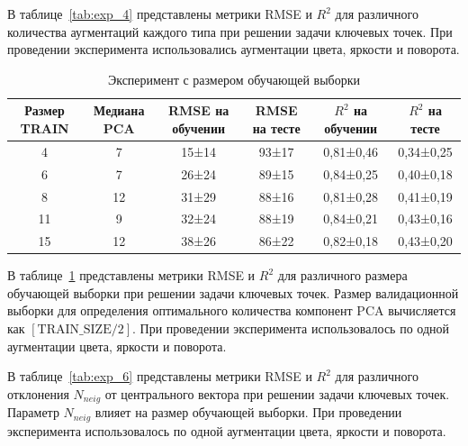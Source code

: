 \documentclass[a4paper,14pt]{article}
\begin{document}
\begin{landscape}
\begin{table}[H]
    \end{table}

   	В таблице~\ref{tab:exp_4}  представлены метрики RMSE и $R^2$ для различного количества аугментаций каждого типа при решении задачи ключевых точек. 
   	При проведении эксперимента использовались аугментации цвета, яркости и поворота.

    \begin{table}[H]
        \centering
        \caption{Эксперимент с размером обучающей выборки}
        \label{tab:exp_5}

        \begin{tabular}{cccccc}
            \toprule
            Размер TRAIN & Медиана PCA &  RMSE на обучении  & RMSE на тесте & $R^2$ на обучении & $R^2$ на тесте  \\
            \midrule
            4           & 7            & 15±14       & 93±17      & 0,81±0,46 & 0,34±0,25 \\
            6           & 7            & 26±24       & 89±15      & 0,84±0,25 & 0,40±0,18 \\
            8           & 12           & 31±29       & 88±16      & 0,81±0,28 & 0,41±0,19 \\
            11          & 9            & 32±24       & 88±19      & 0,84±0,21 & 0,43±0,16 \\
            15          & 12           & 38±26       & 86±22      & 0,82±0,18 & 0,43±0,20 \\
            \bottomrule
        \end{tabular}

    \end{table}

	В таблице~\ref{tab:exp_5}  представлены метрики RMSE и $R^2$ для различного размера обучающей выборки при решении задачи ключевых точек. Размер валидационной выборки для определения оптимального количества компонент PCA вычисляется как $[\text{TRAIN\_SIZE} / 2]$. При проведении эксперимента использовалось по одной аугментации цвета, яркости и поворота.
	
	В таблице~\ref{tab:exp_6} представлены метрики RMSE и $R^2$ для различного отклонения $N_{neig}$ от центрального вектора при решении задачи ключевых точек. Параметр $N_{neig}$ влияет на размер обучающей выборки. При проведении эксперимента использовалось по одной аугментации цвета, яркости и поворота.

    \end{landscape}
\end{document}
